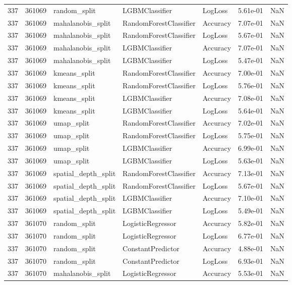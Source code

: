 \begin{tabular}{rrlllrr}
337 & 361069 & random\_split & LGBMClassifier & LogLoss & 5.61e-01 & NaN \\
337 & 361069 & mahalanobis\_split & RandomForestClassifier & Accuracy & 7.07e-01 & NaN \\
337 & 361069 & mahalanobis\_split & RandomForestClassifier & LogLoss & 5.67e-01 & NaN \\
337 & 361069 & mahalanobis\_split & LGBMClassifier & Accuracy & 7.07e-01 & NaN \\
337 & 361069 & mahalanobis\_split & LGBMClassifier & LogLoss & 5.47e-01 & NaN \\
337 & 361069 & kmeans\_split & RandomForestClassifier & Accuracy & 7.00e-01 & NaN \\
337 & 361069 & kmeans\_split & RandomForestClassifier & LogLoss & 5.76e-01 & NaN \\
337 & 361069 & kmeans\_split & LGBMClassifier & Accuracy & 7.08e-01 & NaN \\
337 & 361069 & kmeans\_split & LGBMClassifier & LogLoss & 5.64e-01 & NaN \\
337 & 361069 & umap\_split & RandomForestClassifier & Accuracy & 7.02e-01 & NaN \\
337 & 361069 & umap\_split & RandomForestClassifier & LogLoss & 5.75e-01 & NaN \\
337 & 361069 & umap\_split & LGBMClassifier & Accuracy & 6.99e-01 & NaN \\
337 & 361069 & umap\_split & LGBMClassifier & LogLoss & 5.63e-01 & NaN \\
337 & 361069 & spatial\_depth\_split & RandomForestClassifier & Accuracy & 7.13e-01 & NaN \\
337 & 361069 & spatial\_depth\_split & RandomForestClassifier & LogLoss & 5.67e-01 & NaN \\
337 & 361069 & spatial\_depth\_split & LGBMClassifier & Accuracy & 7.10e-01 & NaN \\
337 & 361069 & spatial\_depth\_split & LGBMClassifier & LogLoss & 5.49e-01 & NaN \\
337 & 361070 & random\_split & LogisticRegressor & Accuracy & 5.82e-01 & NaN \\
337 & 361070 & random\_split & LogisticRegressor & LogLoss & 6.77e-01 & NaN \\
337 & 361070 & random\_split & ConstantPredictor & Accuracy & 4.88e-01 & NaN \\
337 & 361070 & random\_split & ConstantPredictor & LogLoss & 6.93e-01 & NaN \\
337 & 361070 & mahalanobis\_split & LogisticRegressor & Accuracy & 5.53e-01 & NaN \\

\end{tabular}
